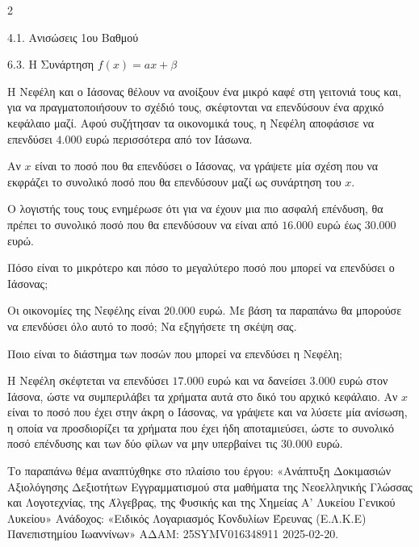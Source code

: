 \begin{ylh}{2}
    \item 4.1. Ανισώσεις 1ου Βαθμού
    \item 6.3. Η Συνάρτηση $f(x)=ax+\beta$
\end{ylh}
Η Νεφέλη και ο Ιάσονας θέλουν να ανοίξουν ένα μικρό καφέ στη γειτονιά τους και, για να πραγματοποιήσουν το σχέδιό τους, σκέφτονται να επενδύσουν ένα αρχικό κεφάλαιο μαζί. Αφού συζήτησαν τα οικονομικά τους, η Νεφέλη αποφάσισε να επενδύσει $4.000$ ευρώ περισσότερα από τον Ιάσωνα.

\begin{alist}
\item Αν $x$ είναι το ποσό που θα επενδύσει ο Ιάσονας, να γράψετε μία σχέση που να εκφράζει το συνολικό ποσό που θα επενδύσουν μαζί ως συνάρτηση του $x$.
\item Ο λογιστής τους τους ενημέρωσε ότι για να έχουν μια πιο ασφαλή επένδυση, θα πρέπει το συνολικό ποσό που θα επενδύσουν να είναι από $16.000$ ευρώ έως $30.000$ ευρώ.

\begin{rlist}
\item Πόσο είναι το μικρότερο και πόσο το μεγαλύτερο ποσό που μπορεί να επενδύσει ο Ιάσονας;
\item Οι οικονομίες της Νεφέλης είναι $20.000$ ευρώ. Με βάση τα παραπάνω θα μπορούσε να επενδύσει όλο αυτό το ποσό; Να εξηγήσετε τη σκέψη σας.
\item Ποιο είναι το διάστημα των ποσών που μπορεί να επενδύσει η Νεφέλη;
\end{rlist}
\item Η Νεφέλη σκέφτεται να επενδύσει $17.000$ ευρώ και να δανείσει $3.000$ ευρώ στον Ιάσονα, ώστε να συμπεριλάβει τα χρήματα αυτά στο δικό του αρχικό κεφάλαιο. Αν $x$ είναι το ποσό που έχει στην άκρη ο Ιάσονας, να γράψετε και να λύσετε μία ανίσωση, η οποία να προσδιορίζει τα χρήματα που έχει ήδη αποταμιεύσει, ώστε το συνολικό ποσό επένδυσης και των δύο φίλων να μην υπερβαίνει τις $30.000$ ευρώ.

{\footnotesize Το παραπάνω θέμα αναπτύχθηκε στο πλαίσιο του έργου: «Ανάπτυξη Δοκιμασιών Αξιολόγησης Δεξιοτήτων Εγγραμματισμού στα μαθήματα της Νεοελληνικής Γλώσσας και Λογοτεχνίας, της Άλγεβρας, της Φυσικής και της Χημείας Α' Λυκείου Γενικού Λυκείου» Ανάδοχος: «Ειδικός Λογαριασμός Κονδυλίων Έρευνας (Ε.Λ.Κ.Ε) Πανεπιστημίου Ιωαννίνων» ΑΔΑΜ: 25SYMV016348911 2025-02-20.}
\end{alist}

